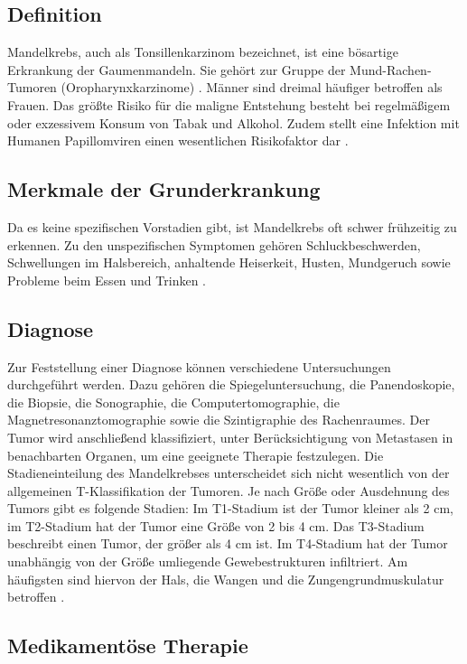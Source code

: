 \documentclass[a4paper,12pt]{article}
\begin{document}
\subsection{Definition}
Mandelkrebs, auch als Tonsillenkarzinom bezeichnet, ist eine bösartige
Erkrankung der Gaumenmandeln. Sie gehört zur Gruppe der Mund-Rachen-Tumoren
(Oropharynxkarzinome) \cite{germanyMandelkrebsSpezialistenInformationen}.
Männer sind dreimal häufiger betroffen als Frauen.
Das größte Risiko für die maligne Entstehung besteht bei regelmäßigem oder
exzessivem Konsum von Tabak und Alkohol. Zudem stellt eine Infektion mit
Humanen Papillomviren einen wesentlichen Risikofaktor dar \cite{doccheckTonsillenkarzinom}.

\subsection{Merkmale der Grunderkrankung}
Da es keine spezifischen Vorstadien gibt, ist Mandelkrebs oft schwer frühzeitig
zu erkennen. Zu den unspezifischen Symptomen gehören Schluckbeschwerden,
Schwellungen im Halsbereich, anhaltende Heiserkeit, Husten, Mundgeruch sowie
Probleme beim Essen und Trinken \cite{germanyMandelkrebsSpezialistenInformationen}.

\subsection{Diagnose}
Zur Feststellung einer Diagnose können verschiedene Untersuchungen durchgeführt
werden. Dazu gehören die Spiegeluntersuchung, die Panendoskopie, die Biopsie,
die Sonographie, die Computertomographie, die Magnetresonanztomographie sowie
die Szintigraphie des Rachenraumes. Der Tumor wird anschließend klassifiziert,
unter Berücksichtigung von Metastasen in benachbarten Organen, um eine geeignete
Therapie festzulegen. Die Stadieneinteilung des Mandelkrebses unterscheidet sich
nicht wesentlich von der allgemeinen T-Klassifikation der Tumoren. Je nach Größe
oder Ausdehnung des Tumors gibt es folgende Stadien: Im T1-Stadium ist der Tumor
kleiner als 2 cm, im T2-Stadium hat der Tumor eine Größe von 2 bis 4 cm. Das T3-Stadium
beschreibt einen Tumor, der größer als 4 cm ist. Im T4-Stadium hat der Tumor
unabhängig von der Größe umliegende Gewebestrukturen infiltriert. Am häufigsten
sind hiervon der Hals, die Wangen und die Zungengrundmuskulatur betroffen \cite{germanyMandelkrebsSpezialistenInformationen}.

\subsection{Medikamentöse Therapie}
\end{document}
